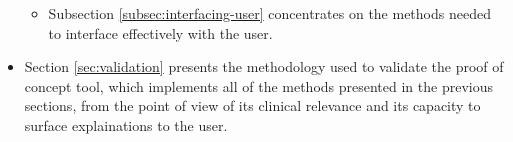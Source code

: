 \begin{itemize}
\begin{itemize}
  		\item Subsection \ref{subsec:interfacing-user} concentrates on the methods needed to interface effectively with the user.
	\end{itemize}
	\item Section \ref{sec:validation} presents the methodology used to validate the proof of concept tool, which implements all of the methods presented in the previous sections, from the point of view of its clinical relevance and its capacity to surface explainations to the user.
\end{itemize}